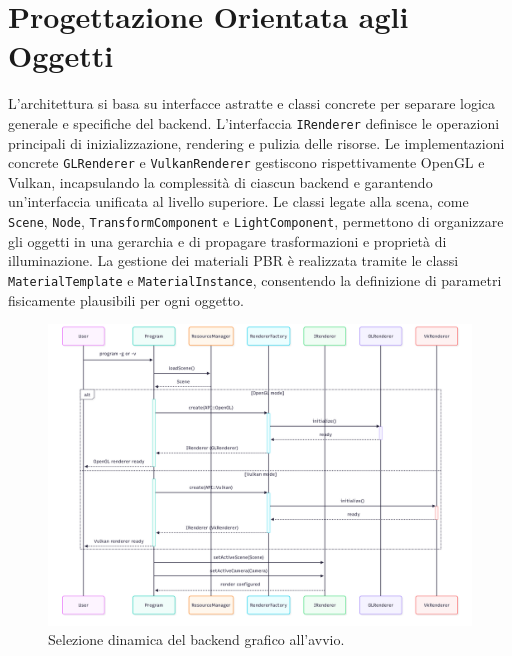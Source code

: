 \documentclass[12pt,a4paper,openright,twoside]{book}
\begin{document}
\section{Progettazione Orientata agli Oggetti}
L'architettura si basa su interfacce astratte e classi concrete per separare logica generale e specifiche del backend.
L'interfaccia \texttt{IRenderer} definisce le operazioni principali di inizializzazione, rendering e pulizia delle risorse.
Le implementazioni concrete \texttt{GLRenderer} e \texttt{VulkanRenderer} gestiscono rispettivamente OpenGL e Vulkan,
incapsulando la complessità di ciascun backend e garantendo un'interfaccia unificata al livello superiore.
Le classi legate alla scena, come \texttt{Scene}, \texttt{Node}, \texttt{TransformComponent} e \texttt{LightComponent},
permettono di organizzare gli oggetti in una gerarchia e di propagare trasformazioni e proprietà di illuminazione. La
gestione dei materiali PBR è realizzata tramite le classi \texttt{MaterialTemplate} e \texttt{MaterialInstance},
consentendo la definizione di parametri fisicamente plausibili per ogni oggetto.
\begin{figure}[H]
    \centering
    \includegraphics[width=.95\linewidth]{figures/uml_activity_dynamic_backend.png}
    \caption{Selezione dinamica del backend grafico all'avvio.}
    \label{fig:uml-activity-dynamic-backend}
\end{figure}
\end{document}

